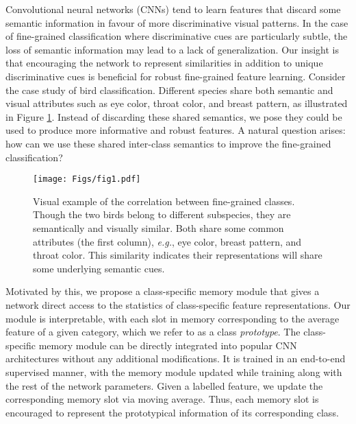 \documentclass[journal]{IEEEtran}
\begin{document}
Convolutional neural networks (CNNs) tend to learn features that discard some semantic information in favour of more discriminative visual patterns. In the case of fine-grained classification where discriminative cues are particularly subtle, the loss of semantic information may lead to a lack of generalization. Our {insight} is that encouraging the network to represent similarities in addition to unique discriminative cues is beneficial for robust fine-grained feature learning. Consider the case study of bird classification. Different species share both semantic and visual attributes such as eye color, throat color, and breast pattern, as illustrated in Figure \ref{fig:motivation}. 
Instead of discarding these shared semantics, we pose they could be used to produce more informative and robust features.
A natural question arises: how can we use these shared inter-class semantics to improve the fine-grained classification? 

\begin{figure}[t]
\begin{center}
\texttt{[image: Figs/fig1.pdf]}
\end{center}
\caption{Visual example of the correlation between fine-grained classes. Though the two birds belong to different subspecies, they are semantically and visually similar. Both share some common attributes (the first column), \emph{e.g.}, eye color, breast pattern, and throat color. This similarity indicates their representations will share some underlying semantic cues.}
\label{fig:motivation}
\end{figure}


Motivated by this, we propose a class-specific memory module that gives a network direct access to the statistics of class-specific feature representations. Our module is interpretable, with each slot in memory corresponding to the average feature of a given category, which we refer to as a class \emph{prototype}. The class-specific memory module can be directly integrated into popular CNN architectures without any additional modifications. It is trained in an end-to-end supervised manner, with the memory module updated while training along with the rest of the network parameters. Given a labelled feature, we update the corresponding memory slot via moving average. Thus, each memory slot is encouraged to represent the prototypical information of its corresponding class.
\end{document}
